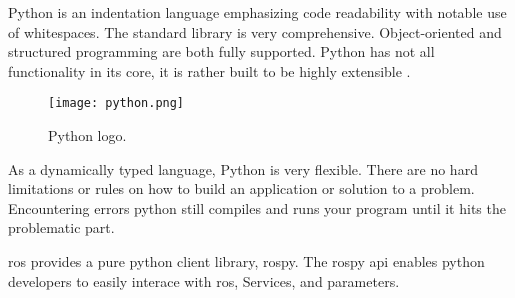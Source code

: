 
Python is an indentation language emphasizing code readability with notable use of whitespaces. 
The standard library is very comprehensive. Object-oriented and structured programming are both fully supported. 
Python has not all functionality in its core, it is rather built to be highly extensible \cite{python:wiki}.

\begin{figure}[ht]
    \centering
    \texttt{[image: python.png]}
    \caption[Python logo]{Python logo\footnotemark.}
\end{figure}

As a dynamically typed language, Python is very flexible. There are no hard limitations or rules 
on how to build an application or solution to a problem. Encountering errors python still compiles 
and runs your program until it hits the problematic part.

\acs{ros} provides a pure python client library, rospy. The rospy \acs{api} enables python developers to easily 
interace with \acs{ros}, Services, and parameters.